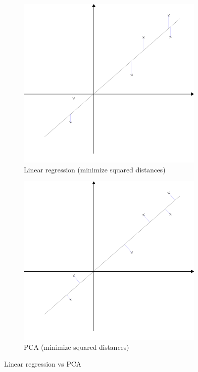 \begin{figure}[htp]
	\centering
	\begin{subfigure}{.5\textwidth}
		\centering
		\includegraphics[width=.85\linewidth]{./assets/linear_regression.png}
		\caption{Linear regression (minimize squared distances)}
	\end{subfigure}%
	\begin{subfigure}{.5\textwidth}
		\centering
		\includegraphics[width=.85\linewidth]{./assets/pca.png}
		\caption{PCA (minimize squared distances)}
	\end{subfigure}
	\caption{Linear regression vs PCA}
\end{figure}

